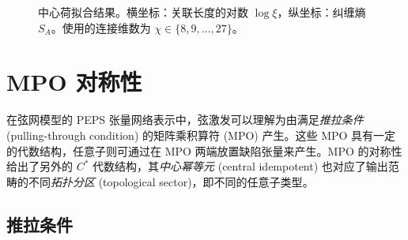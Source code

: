 \begin{figure}[htb]
  \centering
   \quad
  \caption[中心荷拟合结果]{中心荷拟合结果。横坐标：关联长度的对数 $\log\xi$，纵坐标：纠缠熵 $S_A$。使用的连接维数为 $\chi\in\{8,9,\dots,27\}$。}
  \label{fig:central-charge}
\end{figure}


\section{MPO 对称性}

在弦网模型的 PEPS 张量网络表示中，弦激发可以理解为由满足\emph{推拉条件} (pulling-through condition) 的矩阵乘积算符 (MPO) 产生。这些 MPO 具有一定的代数结构，任意子则可通过在 MPO 两端放置缺陷张量来产生。MPO 的对称性给出了另外的 $C^*$ 代数结构，其\emph{中心幂等元} (central idempotent) 也对应了输出范畴的不同\emph{拓扑分区} (topological sector)，即不同的任意子类型\cite{bultinck2017anyons,williamson2017symmetry,lootens2019cardy,aasen2020topological,sahinoglu2021characterizing}。

\subsection{推拉条件}

